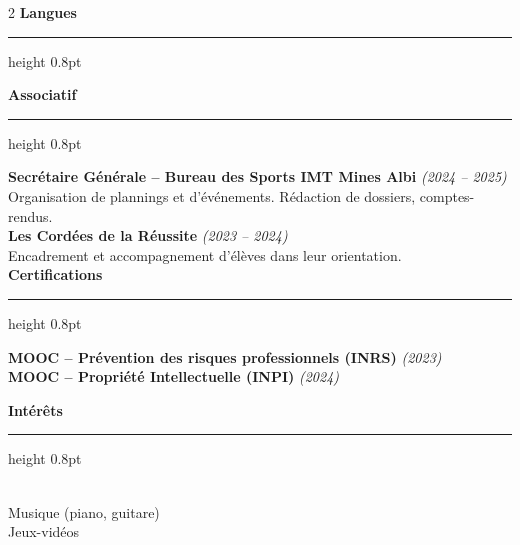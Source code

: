 \documentclass[10.5pt,a4paper]{article}
\newcommand{\subsectitle}[1]{%
  {\color{accent}\bfseries\large #1}\\[-2pt]
  {\color{accent}\hrule height 0.8pt}\vspace{4pt}
}
\newcommand{\sidebardated}[3]{%
  \textbf{\small #1} {\itshape\color{graytext}\footnotesize (#2)}\\
  {\small #3}\\[3pt]
}
\newcommand{\sidebarcert}[2]{%
  \noindent\textbf{\small #1} {\itshape\color{graytext}\footnotesize (#2)}\\[2pt]
}
\begin{document}
\begin{paracol}{2}
\subsectitle{Langues}

\vspace{5pt}

\subsectitle{Associatif}

\sidebardated{Secrétaire Générale -- Bureau des Sports IMT Mines Albi}{2024 -- 2025}{Organisation de plannings et d'événements. Rédaction de dossiers, comptes-rendus.}

\sidebardated{Les Cordées de la Réussite}{2023 -- 2024}{Encadrement et accompagnement d'élèves dans leur orientation.}

\subsectitle{Certifications}

\sidebarcert{MOOC -- Prévention des risques professionnels (INRS)}{2023}
\sidebarcert{MOOC -- Propriété Intellectuelle (INPI)}{2024}

\vspace{4pt}

\subsectitle{Intérêts}
\\
{\small Musique (piano, guitare)}\\
{\small Jeux-vidéos}

\end{paracol}
\end{document}

